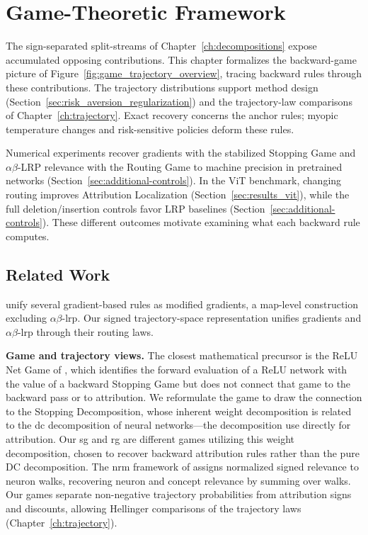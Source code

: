 \chapter{Game-Theoretic Framework}\label{ch:game_theory}\label{app:supp_games}

The sign-separated split-streams of Chapter~\ref{ch:decompositions} expose accumulated opposing contributions. This chapter formalizes the backward-game picture of Figure~\ref{fig:game_trajectory_overview}, tracing backward rules through these contributions.
The trajectory distributions support method design (Section~\ref{sec:risk_aversion_regularization}) and the trajectory-law comparisons of Chapter~\ref{ch:trajectory}. Exact recovery concerns the anchor rules; myopic temperature changes and risk-sensitive policies deform these rules. \begin{changed}Numerical experiments recover gradients with the stabilized Stopping Game and $\alpha\beta$-LRP relevance with the Routing Game to machine precision in pretrained networks (Section~\ref{sec:additional-controls}). In the ViT benchmark, changing routing improves Attribution Localization (Section~\ref{sec:results_vit}), while the full deletion/insertion controls favor LRP baselines (Section~\ref{sec:additional-controls}). These different outcomes motivate examining what each backward rule computes.\end{changed}

\section{Related Work}\label{ptnb:sec:related-work}\label{sec:related_work_games}

\textcite{Ancona2018} unify several gradient-based rules as modified gradients, a map-level construction excluding $\alpha\beta$-\ac{lrp}. Our signed trajectory-space representation unifies gradients and $\alpha\beta$-\ac{lrp} through their routing laws.

\textbf{Game and trajectory views.} The closest mathematical precursor is the ReLU Net Game of
\textcite{Gaubert2025}, which identifies the forward evaluation of a ReLU network with the value of a
backward Stopping Game but does not connect that game to the backward pass or to attribution. We
reformulate the game to draw the connection to the Stopping Decomposition, whose inherent
weight decomposition is related to the \ac{dc} decomposition of neural networks---the decomposition
\textcite{hiddenMono} use directly for attribution. Our \ac{sg} and \ac{rg} are different games
utilizing this weight decomposition, chosen to recover backward attribution rules rather than the
pure DC decomposition.
The \ac{nrm} framework of \textcite{Xiong2026nrm} assigns normalized signed relevance to neuron walks, recovering neuron and concept relevance by summing over walks. Our games separate non-negative trajectory probabilities from attribution signs and discounts, allowing Hellinger comparisons of the trajectory laws (Chapter~\ref{ch:trajectory}).

